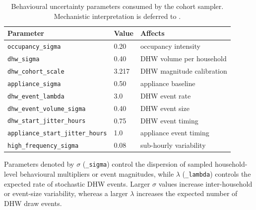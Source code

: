 \begin{table}[ht]
  \centering
  \footnotesize
  \caption{Behavioural uncertainty parameters consumed by the cohort
  sampler. Mechanistic interpretation is deferred to
  .}
  \label{tab:behaviour_uncertainty}
  \begin{tabular}{@{}l l l@{}}
    \toprule
    \textbf{Parameter} & \textbf{Value} & \textbf{Affects} \\
    \midrule
    \texttt{occupancy\_sigma}           & 0.20 & occupancy intensity \\
    \texttt{dhw\_sigma}                 & 0.40 & DHW volume per household \\
    \texttt{dhw\_cohort\_scale}         & 3.217 & DHW magnitude calibration \\
    \texttt{appliance\_sigma}           & 0.50 & appliance baseline \\
    \texttt{dhw\_event\_lambda}         & 3.0 & DHW event rate \\
    \texttt{dhw\_event\_volume\_sigma}  & 0.40 & DHW event size \\
    \texttt{dhw\_start\_jitter\_hours}  & 0.75 & DHW event timing \\
    \texttt{appliance\_start\_jitter\_hours} & 1.0 & appliance event timing \\
    \texttt{high\_frequency\_sigma}     & 0.08 & sub-hourly variability \\
    \bottomrule
  \end{tabular}
\end{table}
Parameters denoted by $\sigma$ (\texttt{\_sigma}) control the dispersion of sampled household-level behavioural multipliers or event magnitudes, while $\lambda$ (\texttt{\_lambda}) controls the expected rate of stochastic DHW events. Larger $\sigma$ values increase inter-household or event-size variability, whereas a larger $\lambda$ increases the expected number of DHW draw events.


